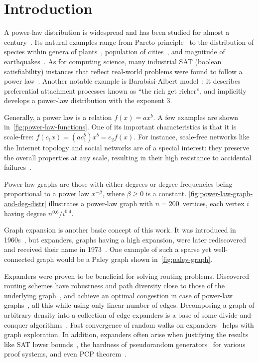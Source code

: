 \chapter{Introduction}
\label{ch:intro}

A power-law distribution is widespread and has been studied for almost a century~\cite{lot26}.
Its natural examples range from Pareto principle~\cite{par97}
to the distribution of species within genera of plants~\cite{yul25},
population of cities~\cite{zip49}, and magnitude of earthquakes~\cite{gr54}.
As for computing science, many industrial SAT (boolean satisfiability) instances
that reflect real-world problems were found to follow a power law~\cite{abl09practical}.
Another notable example is Barab\'asi-Albert model~\cite{ba99}:
it describes preferential attachment processes known as ``the rich get richer'',
and implicitly develops a power-law distribution with the exponent $3$.

Generally, a power law is a relation $f(x)=ax^b$.
A few examples are shown in~\autoref{fig:power-law-functions}.
One of its important characteristics is that it is scale-free: $f(c_1x)=(ac_1^b)x^b=c_2f(x)$.
For instance, scale-free networks like the Internet topology and social networks
are of a special interest: they preserve the overall properties at any scale,
resulting in their high resistance to accidental failures~\cite{bb03,fff99}.

Power-law graphs are those with either degrees or degree frequencies
being proportional to a power law $x^{-\beta}$, where $\beta\geq0$ is a constant.
\autoref{fig:power-law-graph-and-deg-distr} illustrates a power-law graph
with $n=200$~vertices, each vertex $i$ having degree $n^{0.6}/i^{0.4}$.

Graph expansion is another basic concept of this work.
It was introduced in 1960s~\cite{kb67},
but expanders, graphs having a high expansion,
were later rediscovered and received their name in 1973~\cite{pin73}.
One example of such a sparse yet well-connected graph
would be a Paley graph shown in~\autoref{fig:paley-graph}.

Expanders were proven to be beneficial for solving routing problems.
Discovered routing schemes have robustness and path diversity
close to those of the underlying graph~\cite{fgrv14},
and achieve an optimal congestion in case of power-law graphs~\cite{gms03},
all this while using only linear number of edges.
Decomposing a graph of arbitrary density into a collection of edge expanders
is a base of some divide-and-conquer algorithms~\cite{ms17}.
Fast convergence of random walks on expanders~\cite{mih89} helps with graph exploration.
In addition, expanders often arise when justifying the results like
SAT lower bounds~\cite{ahi05,abbimp05,prst16},
the hardness of pseudorandom generators~\cite{abrw04} for various proof systems,
and even PCP theorem~\cite{din07}.

